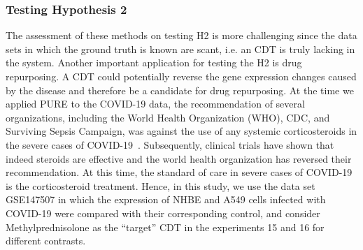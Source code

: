 \subsubsection{Testing Hypothesis 2}

The assessment of these methods on testing H2 is more challenging since the data sets in which the ground truth is known are scant, i.e. an CDT is truly lacking in the system. Another important application for testing the H2 is drug repurposing. A CDT could potentially reverse the  gene expression changes caused by the disease and therefore be a candidate for drug repurposing. 
At the time we applied PURE to the COVID-19 data, the recommendation of several organizations, including the World Health Organization (WHO), CDC, and Surviving Sepsis Campaign, was against the use of any systemic corticosteroids in the severe cases of COVID-19~\cite{wilson2020covid}. 
Subsequently, clinical trials have shown that indeed steroids are effective and the world health organization has reversed their recommendation\cite{meduri2020pharmacological, corral2021methylprednisolone,salton2020prolonged, meduri2020pharmacological, cochrane1996systemic, prescott2020corticosteroids}. At this time, the standard of care in severe cases of COVID-19 is the corticosteroid treatment. 
Hence, in this study, we use the data set GSE147507 in which the expression of NHBE and A549 cells infected with COVID-19 were compared with their corresponding control, and consider Methylprednisolone as the ``target'' CDT in the experiments 15 and 16 for different contrasts. %

